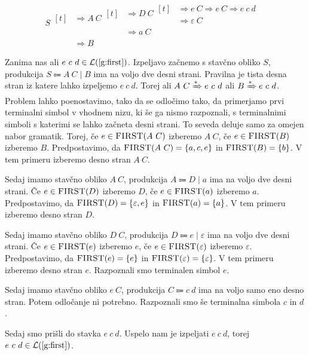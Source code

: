\documentclass{article}
\newcommand{\FIRST}{\textsc{FIRST}}
\newcommand{\Null}{\varepsilon}
\newcommand{\Language}[1]{\mathcal{L}(#1)}
\newcommand{\Arrow}{\Coloneqq}
\newcommand{\Derive}{\Rightarrow}
\newcommand{\DeriveStar}{\xRightarrow{\ast}}
\newcommand{\Seq}{\ }
\newcommand{\Union}{\mathrel{|}}
\begin{document}
\begin{equation*}
  S \begin{aligned}[t]
    &\Derive A \Seq C \begin{aligned}[t]
      &\Derive D \Seq C \begin{aligned}[t]
        &\Derive e \Seq C \Derive e \Seq C \Derive e \Seq c \Seq d\\
        &\Derive \Null \Seq C
      \end{aligned}\\
      &\Derive a \Seq C
    \end{aligned}\\
  &\Derive B
  \end{aligned}
\end{equation*}

Zanima nas ali $e \Seq c \Seq d \in \Language{\text{\ref{g:first}}}$.
Izpeljavo začnemo s stavčno obliko $S$, produkcija $S \Arrow A \Seq C \Union B$ ima na voljo dve desni strani.
Pravilna je tista desna stran iz katere lahko izpeljemo $e \Seq c \Seq d$.
Torej ali $A \Seq C \DeriveStar e \Seq c \Seq d$ ali $B \DeriveStar e \Seq c \Seq d$.
Problem lahko poenostavimo, tako da se odločimo tako, da primerjamo prvi terminalni simbol v vhodnem nizu, ki še ga nismo razpoznali, s terminalnimi simboli s katerimi se lahko začneta desni strani.
To seveda deluje samo za omejen nabor gramatik.
Torej, če $e \in \FIRST(A \Seq C)$ izberemo $A \Seq C$, če $e \in \FIRST(B)$ izberemo $B$.
Predpostavimo, da $\FIRST(A \Seq C) = \{a, c, e\}$ in $\FIRST(B) = \{b\}$.
V tem primeru izberemo desno stran $A \Seq C$.

Sedaj imamo stavčno obliko $A \Seq C$, produkcija $A \Arrow D \Union a$ ima na voljo dve desni strani.
Če $e \in \FIRST(D)$ izberemo $D$, če $e \in \FIRST(a)$ izberemo $a$.
Predpostavimo, da $\FIRST(D) = \{\Null, e\}$ in $\FIRST(a) = \{a\}$.
V tem primeru izberemo desno stran $D$.

Sedaj imamo stavčno obliko $D \Seq C$, produkcija $D \Arrow e \Union \Null$ ima na voljo dve desni strani.
Če $e \in \FIRST(e)$ izberemo $e$, če $e \in \FIRST(\Null)$ izberemo $\Null$.
Predpostavimo, da $\FIRST(e) = \{e\}$ in $\FIRST(\Null) = \{\Null\}$.
V tem primeru izberemo desno stran $e$.
Razpoznali smo terminalen simbol $e$.

Sedaj imamo stavčno obliko $e \Seq C$, produkcija $C \Arrow c \Seq d$ ima na voljo samo eno desno stran.
Potem odločanje ni potrebno.
Razpoznali smo še terminalna simbola $c$ in $d$.

Sedaj smo prišli do stavka $e \Seq c \Seq d$.
Uspelo nam je izpeljati $e \Seq c \Seq d$, torej ${e \Seq c \Seq d \in \Language{\text{\ref{g:first}}}}$.
\end{document}
